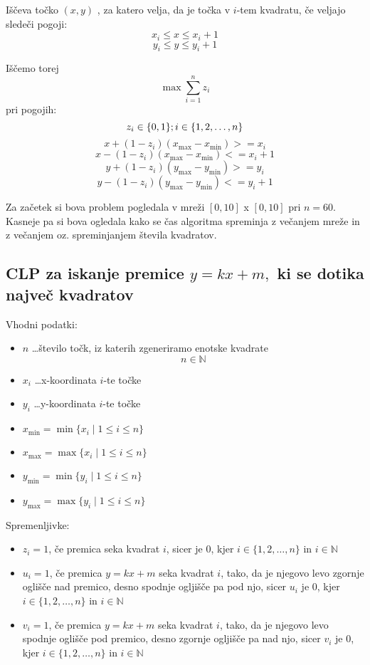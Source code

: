 \documentclass[a4paper]{article}
\begin{document}
Iščeva točko $(x,y)$ , za katero velja, da je točka v $i$-tem kvadratu, če veljajo sledeči pogoji:
$$x_i \le x \le x_i+1$$
$$y_i \le y \le y_i+1$$

Iščemo torej \\
$$\max\sum_{i=1}^n z_{i} $$
pri pogojih:
$$z_{i} \in \{0,1\};i \in \{1, 2, \dots, n\}\\$$
$$ x + (1-z_i)(x_{\max} - x_{\min}) >= x_i $$
$$ x - (1-z_i)(x_{\max} - x_{\min}) <= x_i + 1 $$
$$ y + (1-z_i)(y_{\max} - y_{\min}) >= y_i $$
$$ y - (1-z_i)(y_{\max} - y_{\min}) <= y_i + 1 $$

Za začetek si bova problem pogledala v mreži $[0,10]$ x $[0,10]$ pri $n = 60$. Kasneje pa si bova ogledala kako se čas algoritma spreminja z večanjem mreže in z večanjem oz. spreminjanjem števila kvadratov.\\

\subsection{CLP za iskanje premice $y = kx + m,$ ki se dotika največ kvadratov}

Vhodni podatki:

\begin{itemize}
\item{$n$ \dots število točk, iz katerih zgeneriramo enotske kvadrate} $$n \in \mathbb{N}$$
\item{$x_{i}$ \dots x-koordinata $i$-te točke}
\item{$y_{i}$ \dots y-koordinata $i$-te točke}
\item{$x_{\min} = \min \{x_i \mid 1 \le i \le n\}$}
\item{$x_{\max} = \max \{x_i \mid 1 \le i \le n\}$}
\item{$y_{\min} = \min \{y_i \mid 1 \le i \le n\}$}
\item{$y_{\max} = \max \{y_i \mid 1 \le i \le n\}$}
\end{itemize}

Spremenljivke:

\begin{itemize}
\item{$z_{i}= 1$, če premica seka kvadrat $i$}, sicer je $0$, kjer $i \in \{1, 2, \dots, n\}$ in $i \in \mathbb{N}$
\item{$u_{i}= 1$, če premica $y = kx + m$ seka kvadrat $i$}, tako, da je njegovo levo zgornje oglišče nad premico, desno spodnje ogljišče pa pod njo, sicer $u_i$ je $0$, kjer $i \in \{1, 2, \dots, n\}$ in $i \in \mathbb{N}$
\item{$v_{i}= 1$, če premica $y = kx + m$ seka kvadrat $i$},  tako, da je njegovo levo spodnje oglišče pod premico, desno zgornje ogljišče pa nad njo, sicer $v_i$ je $0$, kjer $i \in \{1, 2, \dots, n\}$ in $i \in \mathbb{N}$
\end{itemize}
\end{document}
